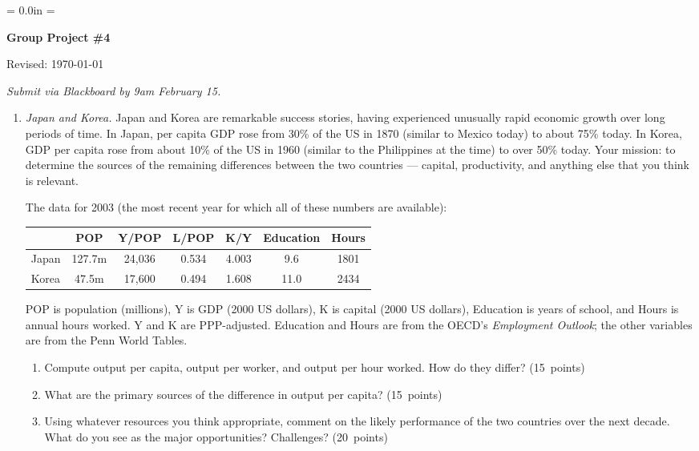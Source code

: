 \documentclass[letterpaper,12pt]{article}
\begin{document}
\parindent = 0.0in
\parskip = \bigskipamount
\thispagestyle{empty}%
\Head

\centerline{\large \bf Group Project \#4}%
\centerline{Revised:  \today}

\medskip
{\it Submit via Blackboard by 9am February 15.}


\begin{enumerate}

\item {\it Japan and Korea. }   
Japan and Korea are remarkable success stories, 
having experienced unusually rapid economic growth over long periods of time.
In Japan, per capita GDP rose from 30\% of the US in 1870 
(similar to Mexico today) to about 75\% today.  
In Korea, GDP per capita rose from about 10\% of the US in 1960 
(similar to the Philippines at the time) 
to over 50\% today.
Your mission:  to determine the sources of the remaining differences
between the two countries --- capital, productivity, and anything else 
that you think is relevant.  

The data for 2003 
(the most recent year for which all of these numbers are available):
\begin{center}
\begin{tabular}{lcccccc}
\hline\hline
        &  POP  &  Y/POP  &  L/POP  &  K/Y     &  Education &  Hours \\
\hline\hline
Japan   & 127.7m &  24,036 &  0.534 & 4.003     & \phantom{1}9.6 & 1801 \\%
Korea   &  \phantom{1}47.5m 
                 &  17,600 &  0.494 & 1.608    & 11.0  &  2434  \\%
\hline\hline
\end{tabular}
\end{center}
POP is population (millions), Y is GDP (2000 US dollars), 
K is capital (2000 US dollars), Education is years of school, 
and Hours is annual hours worked.  
Y and K are PPP-adjusted.  
Education and Hours are from the OECD's {\it Employment Outlook\/};
the other variables are from the Penn World Tables.  


\begin{enumerate}
\item Compute output per capita, output per worker, and output per
hour worked.  How do they differ? (15~points)

\item What are the primary sources of the difference in output per
capita? (15~points)

\item Using whatever resources you think appropriate, 
comment on the likely performance of the two countries over the next 
decade.  
What do you see as the major opportunities?  Challenges?  (20~points) 
\end{enumerate}



\end{enumerate}
\end{document}
